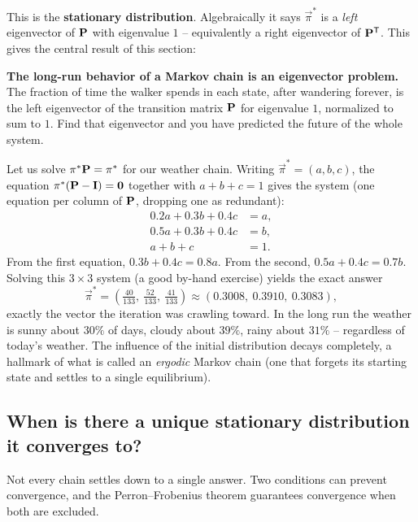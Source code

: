 This is the \textbf{stationary distribution}. Algebraically it says $\vec\pi^\ast$ is a
\emph{left} eigenvector of $\mathbf{P}$ with eigenvalue $1$ -- equivalently a right eigenvector
of $\mathbf{P}^{\mathsf{T}}$. This gives the central result of this section:

\begin{focusbox}
\textbf{The long-run behavior of a Markov chain is an eigenvector problem.} The fraction of
time the walker spends in each state, after wandering forever, is the left eigenvector of
the transition matrix $\mathbf{P}$ for eigenvalue $1$, normalized to sum to $1$. Find that
eigenvector and you have predicted the future of the whole system.
\end{focusbox}

Let us solve $\mathbf{\pi}^\ast\mathbf{P} = \mathbf{\pi}^\ast$ for our weather chain. Writing
$\vec\pi^\ast = (a,b,c)$, the equation $\mathbf{\pi}^\ast(\mathbf{P}-\mathbf{I}) = \mathbf{0}$ together with
$a+b+c=1$ gives the system (one equation per column of $\mathbf{P}$, dropping one as
redundant):
\[
\begin{aligned}
0.2a + 0.3b + 0.4c &= a,\\
0.5a + 0.3b + 0.4c &= b,\\
a + b + c &= 1.
\end{aligned}
\]
From the first equation, $0.3b + 0.4c = 0.8a$. From the second,
$0.5a + 0.4c = 0.7b$. Solving this $3\times3$ system (a good by-hand exercise) yields the
exact answer
\[
\vec\pi^\ast = \left(\tfrac{40}{133},\ \tfrac{52}{133},\ \tfrac{41}{133}\right)
\approx (0.3008,\ 0.3910,\ 0.3083),
\]
exactly the vector the iteration was crawling toward. In the long run the weather is sunny
about $30\%$ of days, cloudy about $39\%$, rainy about $31\%$ -- regardless of today's
weather. The influence of the initial distribution decays completely, a hallmark of what is called an
\emph{ergodic} Markov chain (one that forgets its starting state and settles to a single equilibrium).

\subsection{When is there a unique stationary distribution it converges to?}

Not every chain settles down to a single answer. Two conditions can prevent convergence,
and the Perron--Frobenius theorem guarantees convergence when both are excluded.

